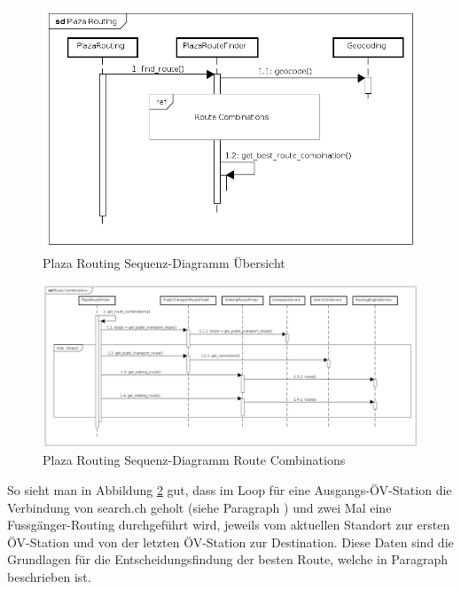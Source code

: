 \begin{figure}[ht]
    \centering
    \includegraphics[width=0.7\linewidth]{projectdoc/img/sequence_diagram_plaza_routing_overview}
    \caption[Plaza Routing Sequenz-Diagramm Übersich]{Plaza Routing Sequenz-Diagramm Übersicht}
    \label{fig:sequence_diagram_plaza_routing_overview}
\end{figure}

\begin{figure}[ht]
    \centering
    \includegraphics[width=1\linewidth]{projectdoc/img/sequence_diagram_plaza_routing_route_comb}
    \caption[Plaza Routing Sequenz-Diagramm Route Combinations]{Plaza Routing Sequenz-Diagramm Route Combinations}
    \label{fig:sequence_diagram_plaza_routing_route_combs}
\end{figure}

So sieht man in Abbildung \ref{fig:sequence_diagram_plaza_routing_route_combs} gut, dass im Loop für eine Ausgangs-ÖV-Station die Verbindung von search.ch \cite{search_ch_route_api} geholt (siehe Paragraph ) und zwei Mal eine Fussgänger-Routing durchgeführt wird, jeweils vom aktuellen Standort zur ersten ÖV-Station und von der letzten ÖV-Station zur Destination. Diese Daten sind die Grundlagen für die Entscheidungsfindung der besten Route, welche in Paragraph  beschrieben ist.


